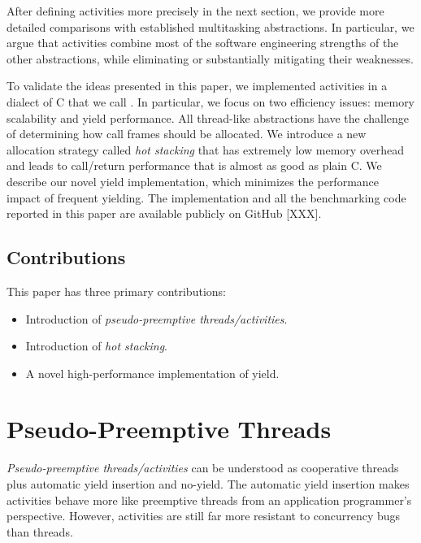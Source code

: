 \documentclass[10pt,preprint]{sigplanconf}
\begin{document}
After defining activities more precisely in the next section, we provide more detailed comparisons with established multitasking abstractions.
In particular, we argue that activities combine most of the software engineering strengths of the other abstractions, while eliminating or substantially mitigating their weaknesses.

To validate the ideas presented in this paper, we implemented activities in a dialect of C that we call \charcoal{}.
In particular, we focus on two efficiency issues: memory scalability and yield performance.
All thread-like abstractions have the challenge of determining how call frames should be allocated.
We introduce a new allocation strategy called \emph{hot stacking} that has extremely low memory overhead and leads to call/return performance that is almost as good as plain C.
We describe our novel yield implementation, which minimizes the performance impact of frequent yielding.
The \charcoal{} implementation and all the benchmarking code reported in this paper are available publicly on GitHub [XXX].


\subsection{Contributions}

This paper has three primary contributions:

\begin{itemize}
\item Introduction of \emph{pseudo-preemptive threads/activities}.
\item Introduction of \emph{hot stacking}.
\item A novel high-performance implementation of yield.
\end{itemize}

\section{Pseudo-Preemptive Threads}

\emph{Pseudo-preemptive threads\slash activities} can be understood as cooperative threads plus automatic yield insertion and no-yield.
The automatic yield insertion makes activities behave more like preemptive threads from an application programmer's perspective.
However, activities are still far more resistant to concurrency bugs than threads.
\end{document}
